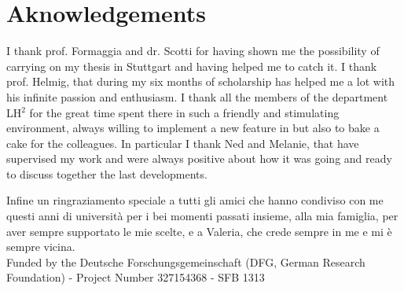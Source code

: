 \chapter*{Aknowledgements}
I thank prof. Formaggia and dr. Scotti for having shown me the possibility of 
carrying on my thesis in Stuttgart and having helped me to catch it.
I thank prof. Helmig, that during my six months of scholarship has helped me a lot with his infinite passion and enthusiasm.
I thank all the members of the department LH$^2$ for the great time spent there in such a friendly and stimulating environment, always willing to implement a new feature in \DUMUX but also to bake a cake for the colleagues. In particular I thank Ned and Melanie, that have supervised my work and were always positive about how it was going and ready to discuss together the last developments.

Infine un ringraziamento speciale a tutti gli amici che hanno condiviso con me questi anni di università per i bei momenti passati insieme, alla mia famiglia, per aver sempre supportato le mie scelte, e a Valeria, che crede sempre in me e mi è sempre vicina.
\\[2\baselineskip]
Funded by the Deutsche Forschungsgemeinschaft (DFG, German Research Foundation) - Project Number 327154368 - SFB 1313